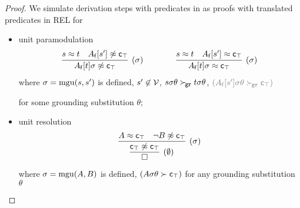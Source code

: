     \begin{proof}
        We simulate derivation steps with predicates in \InstGenEQ
        as proofs with translated predicates in REL for
        \begin{itemize}
            \item unit paramodulation
            \begin{gather*}
                \infer
                [ (\sigma) ]
                {A_\mf[t]\sigma\mNE\mc_\top}
                {s\mEQ t&A_\mf[s']\mNE\mc_\top}
                \qquad\qquad
                \infer
                [ (\sigma)  ]
                {A_\mf[t]\sigma\mEQ \mc_\top}
                {s\mEQ t&A_\mf[s']\mEQ \mc_\top}
                \end{gather*}
            where \( \sigma=\operatorname{mgu}(s,s') \) is defined,
            \( s'\not\in\mathcal{V} \),
            \( s\sigma\theta\mathrel\succ_{\!\mathtt{gr}} t\sigma\theta \),
            \( \textcolor{colG}{(A_\mf[s']\sigma\theta\succG\mc_\top)} \)

            for some grounding substitution \( \theta \);

            \item %
            unit resolution
            \begin{gather*}
                \infer[(\sigma)]
                {
                    \infer[(\emptyset)]
                    {\emptyclause}
                    {\mc_\top \mNE \mc_\top}
                    }
                {A\mEQ\mc_\top & \lnot B\mNE\mc_\top}
            \end{gather*}
            where \( \sigma=\operatorname{mgu}(A,B) \) is defined,
            \textcolor{colG}{
                \( (A\sigma\theta\succ\mathsf{c}_\top) \)
                for any grounding substitution \( \theta \)
            }
        \end{itemize}
    \end{proof}














